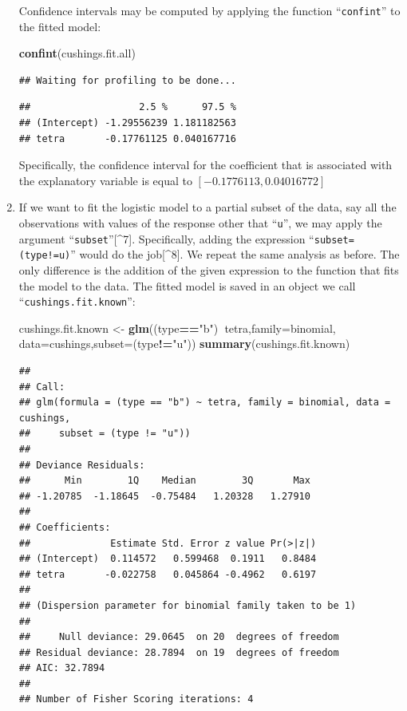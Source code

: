 \documentclass[]{krantz}
\makeatletter
\newenvironment{Shaded}{\begin{snugshade}}{\end{snugshade}}
\newcommand{\KeywordTok}[1]{\textcolor[rgb]{0.13,0.29,0.53}{\textbf{#1}}}
\newcommand{\DataTypeTok}[1]{\textcolor[rgb]{0.13,0.29,0.53}{#1}}
\newcommand{\StringTok}[1]{\textcolor[rgb]{0.31,0.60,0.02}{#1}}
\newcommand{\OperatorTok}[1]{\textcolor[rgb]{0.81,0.36,0.00}{\textbf{#1}}}
\newcommand{\NormalTok}[1]{#1}
\newenvironment{kframe}{%
\medskip{}
\setlength{\fboxsep}{.8em}
 \def\at@end@of@kframe{}%
 \ifinner\ifhmode%
  \def\at@end@of@kframe{\end{minipage}}%
  \begin{minipage}{\columnwidth}%
 \fi\fi%
 \def\FrameCommand##1{\hskip\@totalleftmargin \hskip-\fboxsep
 \colorbox{shadecolor}{##1}\hskip-\fboxsep
     \hskip-\linewidth \hskip-\@totalleftmargin \hskip\columnwidth}%
 \MakeFramed {\advance\hsize-\width
   \@totalleftmargin\z@ \linewidth\hsize
   \@setminipage}}%
 {\par\unskip\endMakeFramed%
 \at@end@of@kframe}
\renewenvironment{Shaded}{\begin{kframe}}{\end{kframe}}
\theoremstyle{definition}
\theoremstyle{definition}
\theoremstyle{definition}
\theoremstyle{remark}
\makeatother
\begin{document}
\begin{enumerate}
  Confidence intervals may be computed by applying the function
  ``\texttt{confint}'' to the fitted model:

\begin{Shaded}
\begin{Highlighting}[]
\KeywordTok{confint}\NormalTok{(cushings.fit.all)}
\end{Highlighting}
\end{Shaded}

\begin{verbatim}
## Waiting for profiling to be done...
\end{verbatim}

\begin{verbatim}
##                   2.5 %      97.5 %
## (Intercept) -1.29556239 1.181182563
## tetra       -0.17761125 0.040167716
\end{verbatim}

  Specifically, the confidence interval for the coefficient that is
  associated with the explanatory variable is equal to
  \([-0.1776113, 0.04016772]\)
\item
  If we want to fit the logistic model to a partial subset of the data,
  say all the observations with values of the response other that
  ``\texttt{u}'', we may apply the argument
  ``\texttt{subset}''{[}\^{}7{]}. Specifically, adding the expression
  ``\texttt{subset=(type!=u)}'' would do the job{[}\^{}8{]}. We repeat
  the same analysis as before. The only difference is the addition of
  the given expression to the function that fits the model to the data.
  The fitted model is saved in an object we call
  ``\texttt{cushings.fit.known}'':

\begin{Shaded}
\begin{Highlighting}[]
\NormalTok{cushings.fit.known <-}\StringTok{ }\KeywordTok{glm}\NormalTok{((type}\OperatorTok{==}\StringTok{"b"}\NormalTok{)}\OperatorTok{~}\NormalTok{tetra,}\DataTypeTok{family=}\NormalTok{binomial, }\DataTypeTok{data=}\NormalTok{cushings,}\DataTypeTok{subset=}\NormalTok{(type}\OperatorTok{!=}\StringTok{"u"}\NormalTok{))}
\KeywordTok{summary}\NormalTok{(cushings.fit.known)}
\end{Highlighting}
\end{Shaded}

\begin{verbatim}
## 
## Call:
## glm(formula = (type == "b") ~ tetra, family = binomial, data = cushings, 
##     subset = (type != "u"))
## 
## Deviance Residuals: 
##      Min        1Q    Median        3Q       Max  
## -1.20785  -1.18645  -0.75484   1.20328   1.27910  
## 
## Coefficients:
##              Estimate Std. Error z value Pr(>|z|)
## (Intercept)  0.114572   0.599468  0.1911   0.8484
## tetra       -0.022758   0.045864 -0.4962   0.6197
## 
## (Dispersion parameter for binomial family taken to be 1)
## 
##     Null deviance: 29.0645  on 20  degrees of freedom
## Residual deviance: 28.7894  on 19  degrees of freedom
## AIC: 32.7894
## 
## Number of Fisher Scoring iterations: 4
\end{verbatim}


\end{enumerate}
\end{document}
